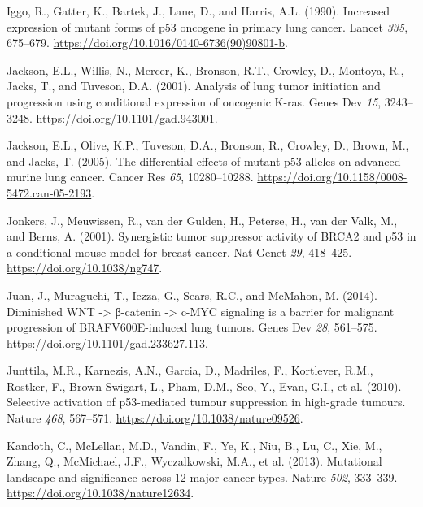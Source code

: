 \begin{CSLReferences}{0}{0}
\leavevmode{}%
Iggo, R., Gatter, K., Bartek, J., Lane, D., and Harris, A.L. (1990). Increased expression of mutant forms of p53 oncogene in primary lung cancer. Lancet \emph{335}, 675--679. \url{https://doi.org/10.1016/0140-6736(90)90801-b}.

\leavevmode{}%
Jackson, E.L., Willis, N., Mercer, K., Bronson, R.T., Crowley, D., Montoya, R., Jacks, T., and Tuveson, D.A. (2001). Analysis of lung tumor initiation and progression using conditional expression of oncogenic K-ras. Genes Dev \emph{15}, 3243--3248. \url{https://doi.org/10.1101/gad.943001}.

\leavevmode{}%
Jackson, E.L., Olive, K.P., Tuveson, D.A., Bronson, R., Crowley, D., Brown, M., and Jacks, T. (2005). The differential effects of mutant p53 alleles on advanced murine lung cancer. Cancer Res \emph{65}, 10280--10288. \url{https://doi.org/10.1158/0008-5472.can-05-2193}.

\leavevmode{}%
Jonkers, J., Meuwissen, R., van der Gulden, H., Peterse, H., van der Valk, M., and Berns, A. (2001). Synergistic tumor suppressor activity of BRCA2 and p53 in a conditional mouse model for breast cancer. Nat Genet \emph{29}, 418--425. \url{https://doi.org/10.1038/ng747}.

\leavevmode{}%
Juan, J., Muraguchi, T., Iezza, G., Sears, R.C., and McMahon, M. (2014). Diminished WNT -\textgreater{} β-catenin -\textgreater{} c-MYC signaling is a barrier for malignant progression of BRAFV600E-induced lung tumors. Genes Dev \emph{28}, 561--575. \url{https://doi.org/10.1101/gad.233627.113}.

\leavevmode{}%
Junttila, M.R., Karnezis, A.N., Garcia, D., Madriles, F., Kortlever, R.M., Rostker, F., Brown Swigart, L., Pham, D.M., Seo, Y., Evan, G.I., et al. (2010). Selective activation of p53-mediated tumour suppression in high-grade tumours. Nature \emph{468}, 567--571. \url{https://doi.org/10.1038/nature09526}.

\leavevmode{}%
Kandoth, C., McLellan, M.D., Vandin, F., Ye, K., Niu, B., Lu, C., Xie, M., Zhang, Q., McMichael, J.F., Wyczalkowski, M.A., et al. (2013). Mutational landscape and significance across 12 major cancer types. Nature \emph{502}, 333--339. \url{https://doi.org/10.1038/nature12634}.


\end{CSLReferences}
